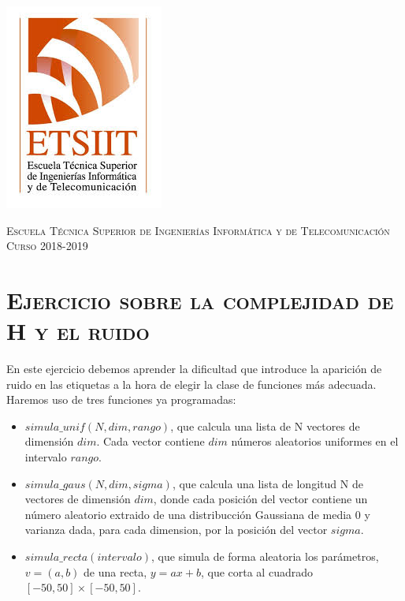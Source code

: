 \documentclass[11pt,a4paper]{article}
\begin{document}
\begin{titlepage}
\begin{minipage}{\textwidth}
\includegraphics[scale=0.3]{img/etsiit.jpeg}

\vspace{0.7cm}
\textsc{Escuela Técnica Superior de Ingenierías Informática y de Telecomunicación}\\
\vspace{1cm}
\textsc{Curso 2018-2019}
\end{minipage}
\end{titlepage}

\tableofcontents
\thispagestyle{empty}				%

\newpage

\setlength{\parskip}{1em}

\section{\textsc{Ejercicio sobre la complejidad de H y el ruido}}
En este ejercicio debemos aprender la dificultad que introduce la aparición de ruido en las
etiquetas a la hora de elegir la clase de funciones más adecuada. Haremos uso de tres funciones
ya programadas:

\begin{itemize}
	\item $simula\_unif(N, dim, rango)$, que calcula una lista de N vectores de dimensión $dim$.
	Cada vector contiene $dim$ números aleatorios uniformes en el intervalo $rango$.
	\item $simula\_gaus(N, dim, sigma)$, que calcula una lista de longitud N de vectores de
	dimensión $dim$, donde cada posición del vector contiene un número aleatorio extraido de una
	distribucción Gaussiana de media 0 y varianza dada, para cada dimension, por la posición
	del vector $sigma$.
	\item $simula\_recta(intervalo)$, que simula de forma aleatoria los parámetros, $v = (a, b)$
	de una recta, $y = ax + b$, que corta al cuadrado $[-50, 50] \times [-50, 50]$.
\end{itemize}
\end{document}
